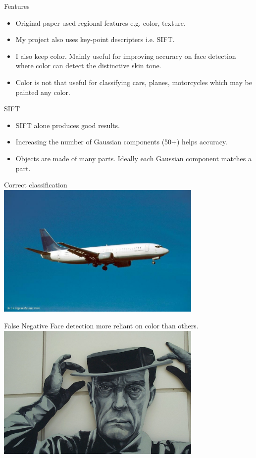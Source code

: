 \documentclass{beamer}
\begin{document}
\begin{frame}{Features}
\begin{itemize}
  \item Original paper used regional features e.g. color, texture.
  \item My project also uses key-point descripters i.e. SIFT.
  \item I also keep color. Mainly useful for improving accuracy on
    face detection where color can detect the distinctive skin tone.
  \item Color is not that useful for classifying cars, planes,
    motorcycles which may be painted any color.
\end{itemize}    
\end{frame}

\begin{frame}{SIFT}
\begin{itemize}
  \item SIFT alone produces good results.
  \item Increasing the number of Gaussian components (50+) helps accuracy.
  \item Objects are made of many parts. Ideally each Gaussian
    component matches a part.
\end{itemize}    
\end{frame}

\begin{frame}{Correct classification}
  \includegraphics[width=100mm]{images/plane_true_positive.png}
\end{frame}

\begin{frame}{False Negative}
  Face detection more reliant on color than others.
\includegraphics[width=100mm]{images/face_false_negative.png}
\end{frame}
\end{document}
